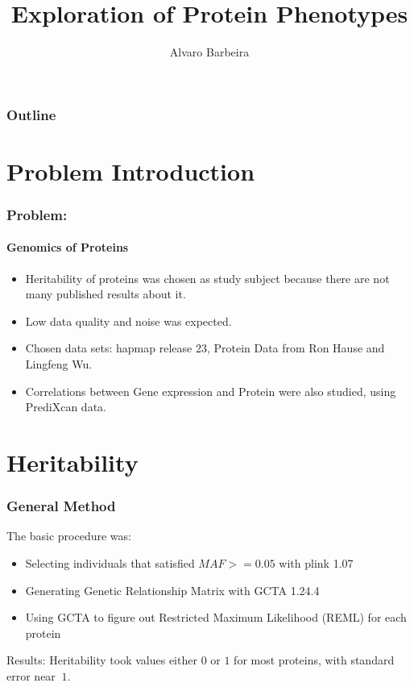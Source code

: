 \documentclass{beamer}
\title{Exploration of Protein Phenotypes}
\author{Alvaro Barbeira}
\begin{document}
  \begin{frame}
    \titlepage
  \end{frame}
  \begin{frame}
    \frametitle{Outline}
    \tableofcontents
  \end{frame}
  \section{Problem Introduction}
  \begin{frame}
    \frametitle{Problem:}
    \framesubtitle{Genomics of Proteins}
    \begin{itemize}
      \item
      Heritability of proteins was chosen as study subject because there are not many published results about it.
      \item
      Low data quality and noise was expected.
      \item
      Chosen data sets: hapmap release 23, Protein Data from Ron Hause and Lingfeng Wu.
      \item
      Correlations between Gene expression and Protein were also studied, using PrediXcan data.
    \end{itemize}
  \end{frame}
  
  \section{Heritability}
  
  \begin{frame}
    \frametitle{General Method}
    The basic procedure was:
    \begin{itemize}
      \item
      Selecting individuals that satisfied $MAF >= 0.05$ with plink 1.07
      \item
      Generating Genetic Relationship Matrix with GCTA 1.24.4
      \item
      Using GCTA to figure out Restricted Maximum Likelihood (REML) for each protein
    \end{itemize}
    \vskip15pt
    Results:
    Heritability took values either $0$ or $1$ for most proteins, with standard error near $~1$.
  \end{frame}
  
\end{document}
